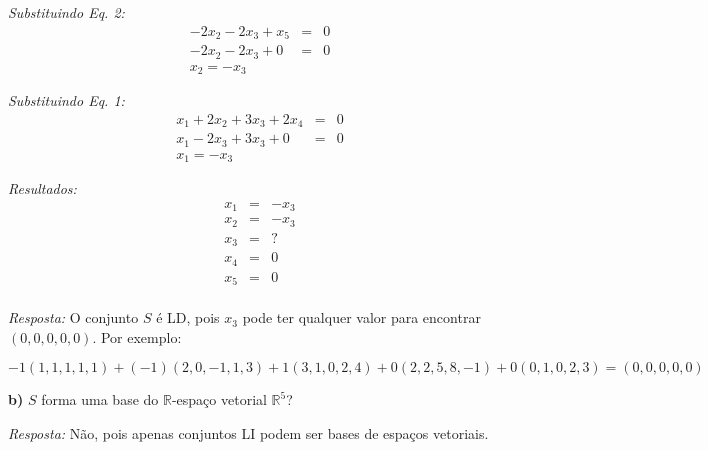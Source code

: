 \documentclass[11pt]{article}
\newenvironment{question}[1]
  {\par\addvspace{\medskipamount}
   \noindent\makebox[0pt][r]{\textbf{#1)} }\ignorespaces}
  {\par\addvspace{\medskipamount}}
\begin{document}
\begin{question}{2}
\textit{Substituindo Eq. 2:}
$$
\begin{array}{rcl}
  -2x_2-2x_3+x_5  &= &0\\
  -2x_2-2x_3+0  &= &0\\
  x_2 = -x_3
\end{array}
$$

\textit{Substituindo Eq. 1:}
$$
\begin{array}{rcl}
  x_1+2x_2+3x_3+2x_4 &= &0\\
  x_1-2x_3+3x_3+0 &= &0\\
  x_1 = -x_3
\end{array}
$$

\textit{Resultados:}
$$
\begin{array}{rcl}
  x_1 &= &-x_3\\
  x_2 &= &-x_3\\
  x_3 &= &?\\
  x_4 &= &0\\
  x_5 &= &0\\
\end{array}
$$

\textit{Resposta:} O conjunto $S$ é LD, pois $x_3$ pode ter qualquer valor para encontrar $(0,0,0,0,0)$. Por exemplo:

$$-1(1,1,1,1,1)+(-1)(2,0,-1,1,3)+1(3,1,0,2,4)+0(2,2,5,8,-1)+0(0,1,0,2,3)=(0,0,0,0,0)$$

\textbf{b)} $S$ forma uma base do $\mathbb{R}$-espaço vetorial $\mathbb{R}^5$?

\textit{Resposta:} Não, pois apenas conjuntos LI podem ser bases de espaços vetoriais.


\end{question}
\end{document}
